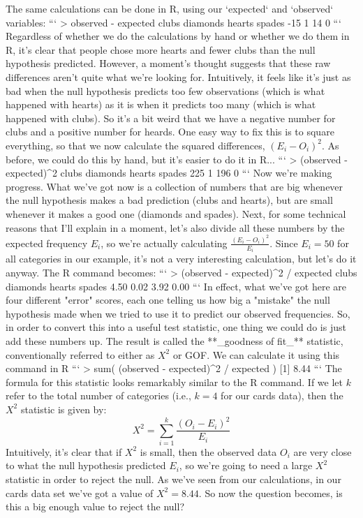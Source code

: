The same calculations can be done in R, using our `expected` and `observed` variables:
```
> observed - expected 
   clubs diamonds   hearts   spades 
     -15        1       14        0 
```
Regardless of whether we do the calculations by hand or whether we do them in R, it's clear that people chose more hearts and fewer clubs than the null hypothesis predicted. However, a moment's thought suggests that these raw differences aren't quite what we're looking for. Intuitively, it feels like it's just as bad when the null hypothesis predicts too few observations (which is what happened with hearts) as it is when it predicts too many (which is what happened with clubs). So it's a bit weird that we have a negative number for clubs and a positive number for heards. One easy way to fix this is to square everything, so that we now calculate the squared differences, $(E_i - O_i)^2$. As before, we could do this by hand, but it's easier to do it in R...
```
> (observed - expected)^2
   clubs diamonds   hearts   spades 
     225        1      196        0 
```
Now we're making progress. What we've got now is a collection of numbers that are big whenever the null hypothesis makes a bad prediction (clubs and hearts), but are small whenever it makes a good one (diamonds and spades). Next, for some technical reasons that I'll explain in a moment, let's also divide all these numbers by the expected frequency $E_i$, so we're actually calculating $\frac{(E_i-O_i)^2}{E_i}$. Since $E_i = 50$ for all categories in our example, it's not a very interesting calculation, but let's do it anyway. The R command becomes:
```
> (observed - expected)^2 / expected
   clubs diamonds   hearts   spades 
    4.50     0.02     3.92     0.00 
```
In effect, what we've got here are four different "error" scores, each one telling us how big a "mistake" the null hypothesis made when we tried to use it to predict our observed frequencies. So, in order to convert this into a useful test statistic, one thing we could do is just add these numbers up. The result is called the **_goodness of fit_** statistic, conventionally referred to either as $X^2$ or GOF. We can calculate it using this command in R
```
> sum( (observed - expected)^2 / expected )
[1] 8.44
```
The formula for this statistic looks remarkably similar to the R command. If we let $k$ refer to the total number of categories (i.e., $k=4$ for our cards data), then the $X^2$ statistic is given by:
$$
X^2 = \sum_{i=1}^k \frac{(O_i - E_i)^2}{E_i}
$$ 
Intuitively, it's clear that if $X^2$ is small, then the observed data $O_i$ are very close to what the null hypothesis predicted $E_i$, so we're going to need a large $X^2$ statistic in order to reject the null. As we've seen from our calculations, in our cards data set we've got a value of $X^2 = 8.44$. So now the question becomes, is this a big enough value to reject the null?

